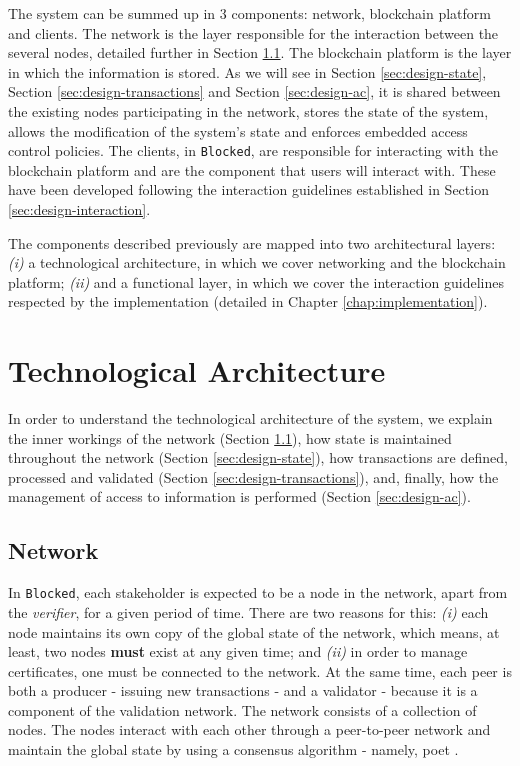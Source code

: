 The system can be summed up in 3 components: network, blockchain platform and clients. The network is the layer responsible for the interaction between the several nodes, detailed further in Section \ref{sec:design-network}. The blockchain platform is the layer in which the information is stored. As we will see in Section \ref{sec:design-state}, Section \ref{sec:design-transactions} and Section \ref{sec:design-ac}, it is shared between the existing nodes participating in the network, stores the state of the system, allows the modification of the system's state and enforces embedded access control policies. The clients, in \texttt{Blocked}, are responsible for interacting with the blockchain platform and are the component that users will interact with. These have been developed following the interaction guidelines established in Section \ref{sec:design-interaction}.

The components described previously are mapped into two architectural layers: \emph{(i)} a technological architecture, in which we cover networking and the blockchain platform; \emph{(ii)} and a functional layer, in which we cover the interaction guidelines respected by the implementation (detailed in Chapter \ref{chap:implementation}).

\section{Technological Architecture}
\label{sec:design-architecture}

In order to understand the technological architecture of the system, we explain the inner workings of the network (Section \ref{sec:design-network}), how state is maintained throughout the network (Section \ref{sec:design-state}), how transactions are defined, processed and validated (Section \ref{sec:design-transactions}), and, finally, how the management of access to information is performed (Section \ref{sec:design-ac}).

\subsection{Network}
\label{sec:design-network}

In \texttt{Blocked}, each stakeholder is expected to be a node in the network, apart from the \textit{verifier}, for a given period of time. There are two reasons for this: \emph{(i)} each node maintains its own copy of the global state of the network, which means, at least, two nodes \textbf{must} exist at any given time; and \emph{(ii)} in order to manage certificates, one must be connected to the network. At the same time, each peer is both a producer - issuing new transactions - and a validator - because it is a component of the validation network. The network consists of a collection of nodes. The nodes interact with each other through a peer-to-peer network and maintain the global state by using a consensus algorithm - namely, \gls{poet} \cite{intel_poet}.

